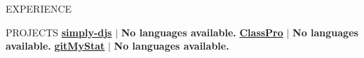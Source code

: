 \documentclass{resume} %
\begin{document}






\begin{rSection}{EXPERIENCE}
    
\end{rSection}



\begin{rSection}{PROJECTS}    
    \textbf{\href{https://github.com/Rahuletto/simply-djs}{simply-djs}} \(\mid\) \textbf{No languages available.}
\textbf{\href{https://github.com/Rahuletto/ClassPro}{ClassPro}} \(\mid\) \textbf{No languages available.}
\textbf{\href{https://github.com/Rahuletto/gitMyStat}{gitMyStat}} \(\mid\) \textbf{No languages available.}
\end{rSection}



%     





\end{document}
